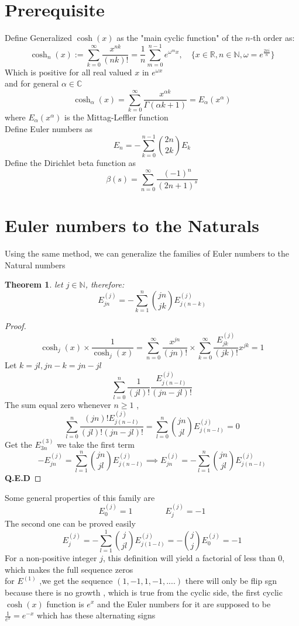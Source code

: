 \documentclass{article}
\newtheorem{Theorem}{Theorem}
\newcommand{\NotDefinedcosh}[2]{\operatorname{cosh}_{#1}\text{#2}}
\begin{document}
\section{Prerequisite}
Define Generalized $\cosh(x)$ as the "main cyclic function" of the $n$-th order as\cite{Ungar1982}: 
\[\NotDefinedcosh{n}{}(x):=\sum_{k=0}^\infty \frac{x^{nk}}{(nk)!}=\frac{1}{n}\sum_{m=0}^{n-1}e^{\omega^m x}, 
\quad \{x\in \mathbb{R},n\in\mathbb{N},\omega = e^{\frac{2\pi i}{n}}\}\]
Which is positive for all real valued $x$ in $e^{\omega x}$\\
and for general $\alpha \in \mathbb{C}$ \[\NotDefinedcosh{\alpha}{}(x)=\sum_{k=0}^\infty \frac{x^{\alpha k}}{\Gamma(\alpha k+1)} =E_{\alpha}(x^{\alpha}) \]
where $E_{\alpha}(x^{\alpha})$ is the Mittag-Leffler function \cite{Gorenflo2014}\\
Define Euler numbers as \cite{RoaGonzalez2025} 
\[E_{n} =-\sum_{k=0}^{n-1}\binom{2n}{2k} E_{k}\]
Define the Dirichlet beta function as \cite{AbramowitzStegun1964:Beta} 
\[\beta(s) = \sum_{n=0}^{\infty}\frac{(-1)^n}{(2n+1)^s}\]
\section{Euler numbers to the Naturals}
Using the same method, we can generalize the families of Euler numbers to the Natural numbers
\begin{Theorem}
    let $j \in \mathbb{N}$, therefore:
    \[E^{(j)}_{jn} =-\sum_{k=1}^{n}\binom{jn}{jk} E^{(j)}_{j(n-k)}\]
\end{Theorem} 
\begin{proof}
\[\NotDefinedcosh{j}{}(x) \times \frac{1}{\NotDefinedcosh{j}{}(x)} = \sum_{n=0}^{\infty} \frac{x^{jn}}{(jn)!}\times \sum_{k=0}^{\infty}\frac{E^{(j)}_{jk}}{(jk)!}x^{jk} = 1\]
Let $k=jl,jn-k = jn-jl$
\[\sum_{l=0}^{n}\frac{1}{(jl)!}\frac{E^{(j)}_{j(n-l)}}{(jn-jl)!}\]
The sum equal zero whenever $n \ge 1$ ,
\[\sum_{l=0}^{n}\frac{(jn)! E^{(j)}_{j(n-l)}}{(jl)!(jn-jl)!}=\sum_{l=0}^{n} \binom{jn}{jl}E^{(j)}_{j(n-l)} = 0\]
Get the $E^{(3)}_{3n}$ we take the first term 
\[-E^{(j)}_{jn} = \sum_{l=1}^{n} \binom{jn}{jl}E^{(j)}_{j(n-l)} \implies E^{(j)}_{jn} = -\sum_{l=1}^{n} \binom{jn}{jl}E^{(j)}_{j(n-l)}\]
\textbf{Q.E.D}
\end{proof}

Some general properties of this family are
\[ E^{(j)}_0 = 1 \qquad \qquad E^{(j)}_j = -1\]
The second one can be proved easily 
\[E^{(j)}_j = -\sum_{l=1}^{1} \binom{j}{jl}E^{(j)}_{j(1-l)} = -\binom{j}{j}E^{(j)}_{0}  = - 1\]
For a non-positive integer $j$, this definition will yield a factorial of less than $0$, which makes the full sequence zeros\\
for $E^{(1)}$ ,we get the sequence $(1,-1,1,-1,....)$ there will only be flip sgn because there is no growth , which is true from the cyclic side, the first cyclic $\cosh(x)$ function is $e^x$ and the Euler numbers for it are supposed to be $\frac{1}{e^x} = e^{-x}$ which has these alternating signs
\end{document}
